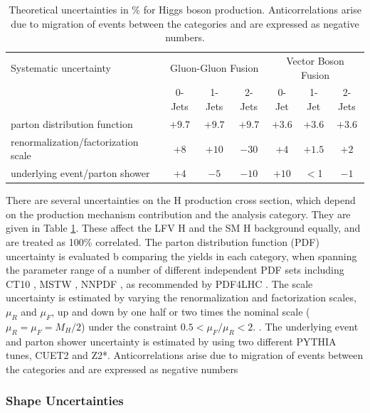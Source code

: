 \documentclass[oneside, letterpaper, oldfontcommands]{memoir}
\begin{document}
\begin{table}[hbtp]
 \centering
  \caption{Theoretical uncertainties in \% for Higgs boson production. Anticorrelations arise due to  migration of events between the categories and are expressed as negative numbers. }
  \label{tab:theory_systematics}
  \begin{tabular}{lccc|ccc} \hline
Systematic uncertainty                  &  \multicolumn{3}{c|}{Gluon-Gluon Fusion} &  \multicolumn{3}{c}{Vector Boson Fusion}  \\ \cline{2-7}
                                &    0-Jets  & 1-Jets  & 2-Jets   & 0-Jet & 1-Jet  & 2-Jets  \\ \hline
parton distribution function         &    $+9.7$  &  $+9.7$ &   $+9.7$ & $+3.6$  &   $+3.6$  &  $+3.6$  \\
renormalization/factorization scale           &    $+8$    &  $+10$   &  $-30$   & $+4$     &   $+1.5$  & $+2$   \\
underlying event/parton shower  &   $+4$     & $-5$   &  $-10$   & $+10$    &   $<$1    & $-1$   \\ \hline
  \end{tabular}

\end{table}


\qquad There are several uncertainties on the H production cross section, which depend on the production mechanism contribution and the analysis category. They are given in Table \ref{tab:theory_systematics}. These affect the LFV H and the SM H background equally, and are treated as 100\% correlated. The parton distribution function (PDF) uncertainty is evaluated b comparing the yields in each category, when spanning the parameter range of a number of different independent PDF sets including CT10 \cite{Nadolsky:2008zw}, MSTW \cite{Martin:2009iq}, NNPDF \cite{Ball:2010de}, as recommended by PDF4LHC \cite{Alekhin:2011sk}. The scale uncertainty is estimated by varying the renormalization and factorization scales, $\mu_{R}$ and $\mu_{F}$, up and down by one half or two times the nominal scale ($\mu_{R} = \mu_{F} = M_{H}/2$) under the constraint $0.5 < \mu_{F}/\mu_{R} < 2$. \cite{Dittmaier:2011ti}. The underlying event and parton shower uncertainty is estimated by using two different PYTHIA tunes, CUET2 and Z2*. Anticorrelations arise due to migration of events between the categories and are expressed as negative numbers
 
\subsubsection{Shape Uncertainties}
\end{document}
